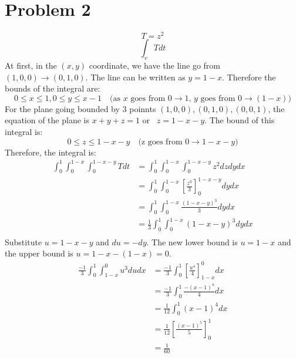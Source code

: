 \documentclass[12pt]{article}
\begin{document}
\section*{Problem 2}
\[T= z^2\]
\[\int_{v}^{} T dt\]
At first, in the \((x,y)\) coordinate, we have the line go from \((1,0,0) \rightarrow (0,1,0)\). The line can be written as \(y = 1 - x\). Therefore the bounds of the integral are:
\[0 \leq x \leq 1, 0 \leq y \leq x - 1 \quad \text{(as \(x\) goes from \(0 \rightarrow 1\), \(y\) goes from \(0 \rightarrow (1-x)\))}\]
For the plane going bounded by 3 poinnts \((1,0,0), (0,1,0), (0,0,1)\), the equation of the plane is \(x+y+z = 1\) or \
\(z = 1 - x - y\). The bound of this integral is:
\[0 \leq z \leq 1 - x - y \quad \text{(z goes from \(0 \rightarrow 1 - x - y\))}\]
Therefore, the integral is:
\begin{align*}
	\int_{0}^{1} \int_{0}^{1-x} \int_{0}^{1-x-y} T dt & = \int_{0}^{1} \int_{0}^{1-x} \int_{0}^{1-x-y} z^2 dz dy dx                \\
	                                                  & = \int_{0}^{1} \int_{0}^{1-x} \left[\frac{z^3}{3}\right]_{0}^{1-x-y} dy dx \\
	                                                  & = \int_{0}^{1} \int_{0}^{1-x} \frac{(1-x-y)^3}{3} dy dx                    \\
	                                                  & = \frac{1}{3} \int_{0}^{1} \int_{0}^{1-x} (1-x-y)^3 dy dx                  \\
\end{align*}
Substitute \( u = 1-x-y\) and \(du = -dy\). The new lower bound is \(u = 1-x\) and the upper bound is \(u = 1-x-(1-x) = 0\).
\begin{align*}
	\frac{-1}{3} \int_{0}^{1} \int_{1-x}^{0} u^3 du dx &= \frac{-1}{3} \int_{0}^{1} \left[\frac{u^4}{4}\right]_{1-x}^{0} dx \\
	&= \frac{-1}{3} \int_{0}^{1} \frac{-(x-1)^4}{4} dx \\
	&= \frac{1}{12} \int_{0}^{1} (x-1)^4 dx \\
	&= \frac{1}{12} \left[\frac{(x-1)^5}{5}\right]_{0}^{1} \\
	&= \frac{1}{60}
\end{align*}
\end{document}
